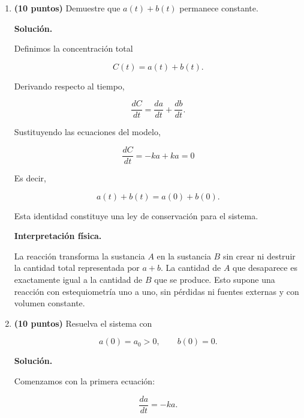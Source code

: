 \documentclass[a4paper,12pt]{article}
\newcommand{\solucion}{
\par\medskip
{\color{solutioncolor}\textbf{Solución.}}
\par
}
\begin{document}
\begin{enumerate}[leftmargin=*,
itemsep=0.8cm]
\begin{enumerate}[label=\alph*),
leftmargin=*,itemsep=0.5cm]
Suponiendo una reacción
uno a uno, cada unidad de
$A$ consumida genera una
unidad de $B$.

Por tanto,

\[
\frac{db}{dt}=r(t)=ka(t).
\]

El modelo matemático es

\[
\boxed{
\begin{cases}
\dot a=-ka,\\
\dot b=ka.
\end{cases}
}
\]

Se trata de un sistema
autónomo y lineal de dos
ecuaciones diferenciales
de primer orden. La primera ecuación describe
la desaparición de $A$,
mientras que la segunda
describe la formación de $B$.

\item \textbf{(10 puntos)}
Demuestre que $a(t)+b(t)$
permanece constante.

\solucion

Definimos la concentración
total

\[
C(t)=a(t)+b(t).
\]

Derivando respecto al tiempo,

\[
\frac{dC}{dt}
=
\frac{da}{dt}
+
\frac{db}{dt}.
\]

Sustituyendo las ecuaciones
del modelo,

\[
\frac{dC}{dt}
=
-ka+ka = 0
\]

Es decir,

\[
\boxed{
a(t)+b(t)=a(0)+b(0).
}
\]

Esta identidad constituye
una ley de conservación
para el sistema.

\textbf{Interpretación física.}

La reacción transforma
la sustancia $A$ en la
sustancia $B$ sin crear
ni destruir la cantidad
total representada por
$a+b$. La cantidad de $A$ que
desaparece es exactamente
igual a la cantidad de
$B$ que se produce. Esto supone una reacción
con estequiometría uno a uno,
sin pérdidas ni fuentes
externas y con volumen
constante.

\item \textbf{(10 puntos)}
Resuelva el sistema con

\[
a(0)=a_0>0,\qquad b(0)=0.
\]

\solucion

Comenzamos con la primera
ecuación:

\[
\frac{da}{dt}=-ka.
\]


\end{enumerate}
\end{enumerate}
\end{document}
